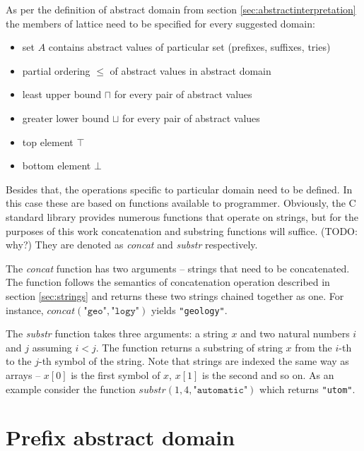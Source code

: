 \documentclass[12pt,final,oneside]{fithesis2}
\theoremstyle{definition}
\begin{document}
As per the definition of abstract domain from section
\ref{sec:abstractinterpretation} the members of lattice need to be
specified for every suggested domain:

\begin{itemize}

\item set $A$ contains abstract values of particular set (prefixes,
suffixes, tries)

\item partial ordering $\leq$ of abstract values in abstract domain

\item least upper bound $\sqcap$ for every pair of abstract values

\item greater lower bound $\sqcup$ for every pair of abstract values

\item top element $\top$

\item bottom element $\bot$

\end{itemize}

Besides that, the operations specific to particular domain need to be
defined. In this case these are based on functions available to programmer.
Obviously, the C standard library provides numerous functions that operate
on strings, but for the purposes of this work concatenation and
substring functions will suffice. (TODO: why?) They are denoted as \textit{concat} and
\textit{substr} respectively.

The \textit{concat} function has two arguments -- strings that need to be
concatenated. The function follows the semantics of concatenation
operation described in section \ref{sec:strings} and returns these two
strings chained together as one. For instance,
$\textit{concat}(\texttt{"geo"}, \texttt{"logy"})$ yields \texttt{"geology"}.

The \textit{substr} function takes three arguments: a string $x$ and two
natural numbers $i$ and $j$ assuming $i < j$. The function returns a
substring of string $x$ from the $i$-th to the $j$-th symbol of the string.
Note that strings are indexed the same way as arrays -- $x[0]$ is the first
symbol of $x$, $x[1]$ is the second and so on. As an example consider the
function $\textit{substr}(1, 4, \texttt{"automatic"})$ which returns
\texttt{"utom"}.


\section{Prefix abstract domain}
\end{document}
